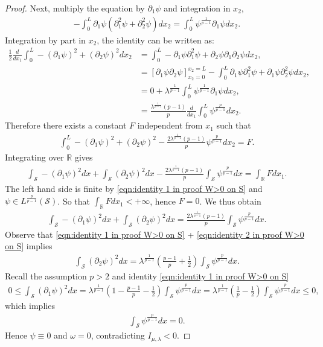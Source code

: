 \documentclass[11pt,letterpaper]{amsart}
\theoremstyle{definition}
\theoremstyle{remark}
\renewcommand{\S}{\mathcal{S}}
\newcommand{\R}{\mathbb{R}}
\newcommand{\p}{\partial}
\numberwithin{equation}{section}
\begin{document}
\begin{proof}
    Next, multiply the equation by $\partial_1\psi$ and integration in $x_2$,
    \begin{align*}
        - \int_{0}^{L} \p_1\psi ( \p_1^2 \psi + \p_2^2\psi ) dx_2 = \int_{0}^{L}  \psi^{\frac{1}{p-1}} \p_1 \psi dx_2.
    \end{align*}
    Integration by part in $x_2$, the identity can be written as:
    \begin{align*}
        \frac{1}{2}\frac{d}{dx_1} \int_{0}^{L} - (\p_1\psi)^2 + (\p_2\psi)^2 dx_2 & = \int_{0}^{L} -\p_1\psi \p_1^2 \psi + \p_2\psi \p_1\p_2 \psi dx_2, \\ 
        & =\left[ \p_1 \psi \p_2 \psi \right]_{x_2=0}^{x_2=L} -\int_{0}^{L} \p_1\psi \p_1^2 \psi + \p_1\psi \p^2_2 \psi dx_2, \\
        & =0+ \lambda^{\frac{1}{p-1}}\int_{0}^{L}  \psi^{\frac{1}{p-1}} \p_1 \psi dx_2, \\
        & =\frac{\lambda^{\frac{1}{p-1}}(p-1)}{p}\frac{d}{dx_1} \int_{0}^{L}  \psi^{\frac{p}{p-1}} dx_2.
    \end{align*}
    Therefore there exists a constant $F$ independent from $x_1$ such that
    \begin{align*}
        \int_{0}^{L} - (\p_1\psi)^2 + (\p_2\psi)^2 -\frac{2\lambda^{\frac{1}{p-1}}(p-1)}{p}\psi^{\frac{p}{p-1}} dx_2 = F.
    \end{align*}
    Integrating over $\mathbb{R}$ gives
    \begin{align*}
        \int_{\S} - (\p_1\psi)^2 dx + \int_{\S} (\p_2\psi)^2  dx-\frac{2\lambda^{\frac{1}{p-1}}(p-1)}{p}\int_{\S} \psi^{\frac{p}{p-1}} dx = \int_{\R}F dx_1.
    \end{align*}
    The left hand side is finite by \eqref{eqn:identity 1 in proof W>0 on S} and $\psi \in L^{\frac{p}{p-1}}(\S)$. So that $\int_{\R}F dx_1<+\infty$, hence $F=0$. We thus obtain
    \begin{align}
        \int_{\S} - (\p_1\psi)^2 dx + \int_{\S} (\p_2\psi)^2  dx = \frac{2\lambda^{\frac{1}{p-1}}(p-1)}{p}\int_{\S} \psi^{\frac{p}{p-1}} dx. \label{eqn:identity 2 in proof W>0 on S}
    \end{align}
    Observe that \eqref{eqn:identity 1 in proof W>0 on S} + \eqref{eqn:identity 2 in proof W>0 on S} implies
    \begin{align*}
        \int_{\S}(\p_2\psi)^2 dx = \lambda^{\frac{1}{p-1}}\left( \frac{p-1}{p} +\frac{1}{2} \right) \int_{\S} \psi^{\frac{p}{p-1}} dx.
    \end{align*}
    Recall the assumption $p>2$ and identity \eqref{eqn:identity 1 in proof W>0 on S}
    \begin{align*}
        0 \leq \int_{\S}(\p_1\psi)^2 dx = \lambda^{\frac{1}{p-1}}\left( 1 - \frac{p-1}{p} - \frac{1}{2} \right) \int_{\S} \psi^{\frac{p}{p-1}} dx = \lambda^{\frac{1}{p-1}}\left( \frac{1}{p}-\frac{1}{2} \right) \int_{\S} \psi^{\frac{p}{p-1}} dx \leq 0,
    \end{align*}
    which implies  
    \begin{align*}
        \int_{\S} \psi^{\frac{p}{p-1}} dx =0.
    \end{align*}
    Hence $\psi\equiv0$ and $\omega=0$, contradicting $I_{\mu,\lambda}<0$.
    

\end{proof}
\end{document}
